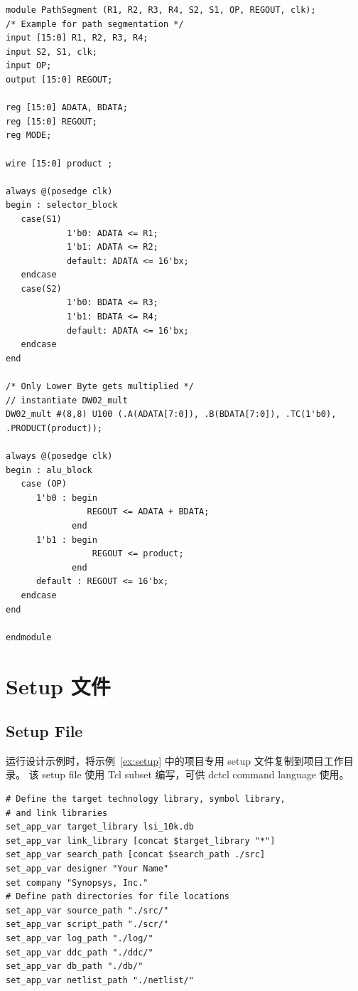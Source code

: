 \begin{lstlisting}[caption={PathSegment.v},label=ex:pathseg-v]
module PathSegment (R1, R2, R3, R4, S2, S1, OP, REGOUT, clk);
/* Example for path segmentation */
input [15:0] R1, R2, R3, R4;
input S2, S1, clk;
input OP;
output [15:0] REGOUT;

reg [15:0] ADATA, BDATA;
reg [15:0] REGOUT;
reg MODE;

wire [15:0] product ;

always @(posedge clk)
begin : selector_block
   case(S1)
            1'b0: ADATA <= R1;
            1'b1: ADATA <= R2;
            default: ADATA <= 16'bx;
   endcase
   case(S2)
            1'b0: BDATA <= R3;
            1'b1: BDATA <= R4;
            default: ADATA <= 16'bx;
   endcase
end

/* Only Lower Byte gets multiplied */
// instantiate DW02_mult
DW02_mult #(8,8) U100 (.A(ADATA[7:0]), .B(BDATA[7:0]), .TC(1'b0),
.PRODUCT(product));

always @(posedge clk)
begin : alu_block
   case (OP)
      1'b0 : begin
                REGOUT <= ADATA + BDATA;
             end
      1'b1 : begin
                 REGOUT <= product;
             end
      default : REGOUT <= 16'bx;
   endcase
end

endmodule
\end{lstlisting}

\section{Setup 文件}
\subsection*{Setup File}

运行设计示例时，将示例~\ref{ex:setup} 中的项目专用 setup 文件复制到项目工作目录。
该 setup file 使用 Tcl subset 编写，可供 dctcl command language 使用。

\begin{lstlisting}[caption={.synopsys\_dc.setup 文件},label=ex:setup]
# Define the target technology library, symbol library,
# and link libraries
set_app_var target_library lsi_10k.db
set_app_var link_library [concat $target_library "*"]
set_app_var search_path [concat $search_path ./src]
set_app_var designer "Your Name"
set company "Synopsys, Inc."
# Define path directories for file locations
set_app_var source_path "./src/"
set_app_var script_path "./scr/"
set_app_var log_path "./log/"
set_app_var ddc_path "./ddc/"
set_app_var db_path "./db/"
set_app_var netlist_path "./netlist/"
\end{lstlisting}

